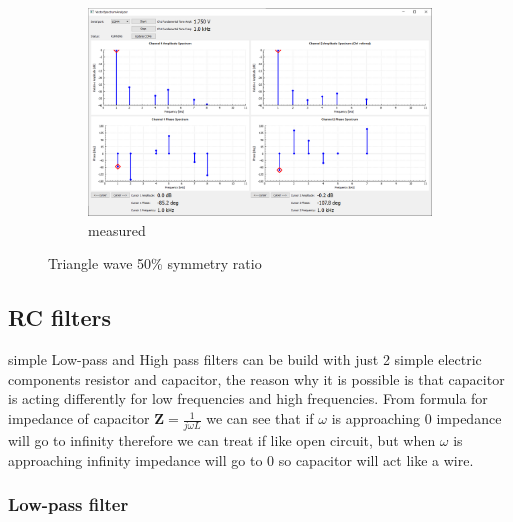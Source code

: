 \documentclass[notitlepage, a4paper, 11pt]{article}
\begin{document}
\begin{figure}[H]
\begin{subfigure}[][][t]{0.3\textwidth}
			\includegraphics[width=\textwidth, trim=10 80 555 100, clip]{../img/Circuit1/trig50}
			\caption{measured}
			\label{fig:meas-signal-a}
		\end{subfigure}
		\caption{Triangle wave 50\% symmetry ratio}
		\label{fig:pure-sin}
	\end{figure}
		
	\subsection{RC filters}
	
	simple Low-pass and High pass filters can be build with just 2 simple electric components resistor and capacitor, the reason why it is possible is that capacitor is acting differently for low frequencies and high frequencies. From formula for impedance of capacitor $\mathbf{Z}=\frac{1}{j\omega L}$ we can see that if $\omega$ is approaching 0 impedance will go to infinity therefore we can treat if like open circuit, but when $\omega$ is approaching infinity impedance will go to 0 so capacitor will act like a wire.
	
	\subsubsection{Low-pass filter}
\end{document}
